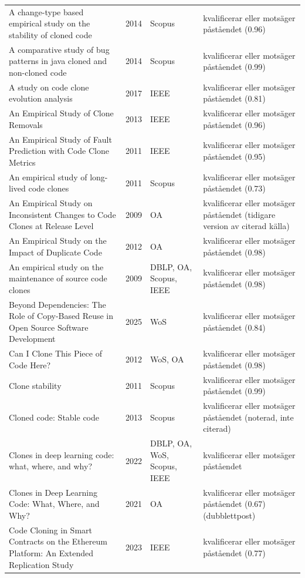 \begin{longtable}{@{}%
  >{\raggedright\arraybackslash}p{}c%
  >{\raggedright\arraybackslash}p{}%
  >{\raggedright\arraybackslash}p{}@{}}
A change-type based empirical study on the stability of cloned code & 2014 & Scopus & kvalificerar eller motsäger påståendet (0.96) \\
A comparative study of bug patterns in java cloned and non-cloned code & 2014 & Scopus & kvalificerar eller motsäger påståendet (0.99) \\
A study on code clone evolution analysis & 2017 & IEEE & kvalificerar eller motsäger påståendet (0.81) \\
An Empirical Study of Clone Removals & 2013 & IEEE & kvalificerar eller motsäger påståendet (0.96) \\
An Empirical Study of Fault Prediction with Code Clone Metrics & 2011 & IEEE & kvalificerar eller motsäger påståendet (0.95) \\
An empirical study of long-lived code clones & 2011 & Scopus & kvalificerar eller motsäger påståendet (0.73) \\
An Empirical Study on Inconsistent Changes to Code Clones at Release Level & 2009 & OA & kvalificerar eller motsäger påståendet (tidigare version av citerad källa) \\
An Empirical Study on the Impact of Duplicate Code & 2012 & OA & kvalificerar eller motsäger påståendet (0.98) \\
An empirical study on the maintenance of source code clones & 2009 & DBLP, OA, Scopus, IEEE & kvalificerar eller motsäger påståendet (0.98) \\
Beyond Dependencies: The Role of Copy-Based Reuse in Open Source Software Development & 2025 & WoS & kvalificerar eller motsäger påståendet (0.84) \\
Can I Clone This Piece of Code Here? & 2012 & WoS, OA & kvalificerar eller motsäger påståendet (0.98) \\
Clone stability & 2011 & Scopus & kvalificerar eller motsäger påståendet (0.99) \\
Cloned code: Stable code & 2013 & Scopus & kvalificerar eller motsäger påståendet (noterad, inte citerad) \\
Clones in deep learning code: what, where, and why? & 2022 & DBLP, OA, WoS, Scopus, IEEE & kvalificerar eller motsäger påståendet \\
Clones in Deep Learning Code: What, Where, and Why? & 2021 & OA & kvalificerar eller motsäger påståendet (0.67) (dubblettpost) \\
Code Cloning in Smart Contracts on the Ethereum Platform: An Extended Replication Study & 2023 & IEEE & kvalificerar eller motsäger påståendet (0.77) \\

\end{longtable}
